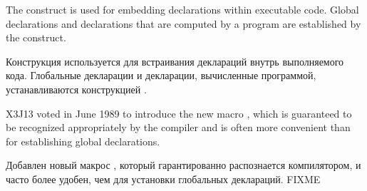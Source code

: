 The  construct is used for embedding declarations within
executable code.  Global declarations and declarations that are computed
by a program are established by the  construct.

Конструкция  используется для встраивания деклараций внутрь
выполняемого кода. Глобальные декларации и декларации, вычисленные программой,
устанавливаются конструкцией .

\begin{newer}
X3J13 voted in June 1989 
to introduce the new macro , which is guaranteed
to be recognized appropriately by the compiler and is often more convenient
than  for establishing global declarations.

Добавлен новый макрос , который гарантированно 
распознается компилятором, и часто более удобен, чем  для
установки глобальных деклараций. FIXME
\end{newer}

